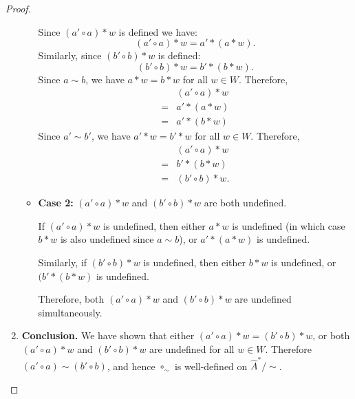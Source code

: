 \begin{proof}
\begin{enumerate}[(1)]
\begin{itemize}
        Since $(a' \circ a) \ast w$ is defined we have:
        \begin{equation}
            (a' \circ a) \ast w = a' \ast (a \ast w).
        \end{equation}
        Similarly, since $(b' \circ b) \ast w$ is defined:
        \begin{equation}
            (b' \circ b) \ast w = b' \ast (b \ast w).
        \end{equation}
        Since $a \sim b$, we have $a \ast w = b \ast w$ for all $w \in W$.
        Therefore,
        \begin{align}
            &(a' \circ a) \ast w \\
            = &a' \ast (a \ast w) \\
            = &a' \ast (b \ast w)
        \end{align}
        Since $a' \sim b'$, we have $a' \ast w = b' \ast w$ for all $w \in W$.
        Therefore,
        \begin{align}
            &(a' \circ a) \ast w \\
            = &b' \ast (b \ast w) \\
            = &(b' \circ b) \ast w.
        \end{align}

        \item \textbf{Case 2:}
        $(a' \circ a) \ast w$ and $(b' \circ b) \ast w$ are both undefined.
        
        If $(a' \circ a) \ast w$ is undefined, then either $a \ast w$ is undefined (in which case $b \ast w$ is also undefined since $a \sim b$), or $a' \ast (a \ast w)$ is undefined.
        
        Similarly, if $(b' \circ b) \ast w$ is undefined, then either $b \ast w$ is undefined, or $(b' \ast (b \ast w)$ is undefined.
        
        Therefore, both $(a' \circ a) \ast w$ and $(b' \circ b) \ast w$ are undefined simultaneously.
    \end{itemize}


    \item \textbf{Conclusion.}
    We have shown that either $(a' \circ a) \ast w = (b' \circ b) \ast w$, or both $(a' \circ a) \ast w$ and $(b' \circ b) \ast w$ are undefined for all $w \in W$.
    Therefore $(a' \circ a) \sim (b' \circ b)$, and hence $\circ_{\sim}$ is well-defined on $\hat{A}^{\ast}/\sim$.

    \end{enumerate}
    
\end{proof}

